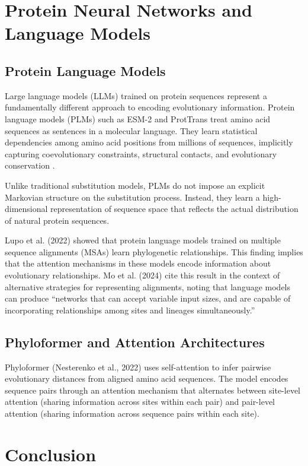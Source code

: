 \section{Protein Neural Networks and Language Models}

\subsection{Protein Language Models}

Large language models (LLMs) trained on protein sequences represent a fundamentally different approach to encoding evolutionary information. Protein language models (PLMs) such as ESM-2 and ProtTrans treat amino acid sequences as sentences in a molecular language. They learn statistical dependencies among amino acid positions from millions of sequences, implicitly capturing coevolutionary constraints, structural contacts, and evolutionary conservation \parencite{valentini2023}.

Unlike traditional substitution models, PLMs do not impose an explicit Markovian structure on the substitution process. Instead, they learn a high-dimensional representation of sequence space that reflects the actual distribution of natural protein sequences.

Lupo et al. (2022) showed that protein language models trained on multiple sequence alignments (MSAs) learn phylogenetic relationships. This finding implies that the attention mechanisms in these models encode information about evolutionary relationships. Mo et al. (2024) cite this result in the context of alternative strategies for representing alignments, noting that language models can produce ``networks that can accept variable input sizes, and are capable of incorporating relationships among sites and lineages simultaneously.''

\subsection{Phyloformer and Attention Architectures}

Phyloformer (Nesterenko et al., 2022) uses self-attention to infer pairwise evolutionary distances from aligned amino acid sequences. The model encodes sequence pairs through an attention mechanism that alternates between site-level attention (sharing information across sites within each pair) and pair-level attention (sharing information across sequence pairs within each site).

\section{Conclusion}


